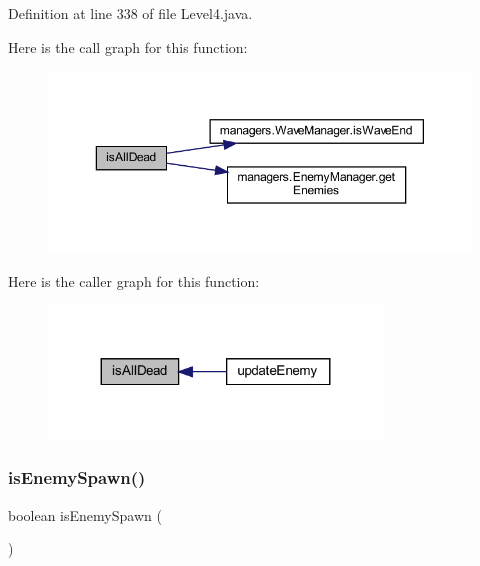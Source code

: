 Definition at line 338 of file Level4.\+java.

Here is the call graph for this function\+:\nopagebreak
\begin{figure}[H]
\begin{center}
\leavevmode
\includegraphics[width=350pt]{classscenes_1_1_level4_acd1846d50c3d8678777f9ab6716f5cf3_cgraph}
\end{center}
\end{figure}
Here is the caller graph for this function\+:\nopagebreak
\begin{figure}[H]
\begin{center}
\leavevmode
\includegraphics[width=251pt]{classscenes_1_1_level4_acd1846d50c3d8678777f9ab6716f5cf3_icgraph}
\end{center}
\end{figure}
\mbox{\label{classscenes_1_1_level4_a121827ebd1c5b24c92f966721b51c0b9}} 
\subsubsection{\texorpdfstring{is\+Enemy\+Spawn()}{isEnemySpawn()}}
{\footnotesize\ttfamily boolean is\+Enemy\+Spawn (\begin{DoxyParamCaption}{ }\end{DoxyParamCaption})\hspace{0.3cm}{\ttfamily [private]}}



